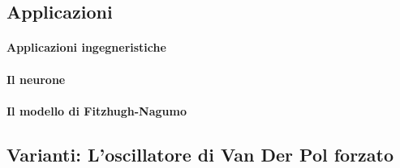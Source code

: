 \documentclass[12pt]{article}
\begin{document}
\subsection{Applicazioni}
\paragraph{Applicazioni ingegneristiche \\}
\paragraph{Il neurone \\}
\paragraph{Il modello di Fitzhugh-Nagumo \\}
\subsection{Varianti: L'oscillatore di Van Der Pol forzato}
\end{document}

